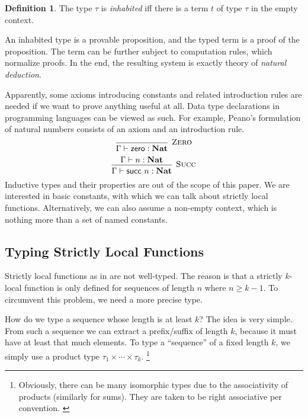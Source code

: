 \documentclass[11pt]{article}
\theoremstyle{definition}
\newtheorem{definition}{Definition}
\theoremstyle{plain}
\begin{document}
\begin{definition}
  The type \(\tau\) is \emph{inhabited} iff there is a term \(t\)
  of type \(\tau\) in the empty context.
\end{definition}

An inhabited type is a provable proposition, and the typed term is a
proof of the proposition.  The term can be further subject to
computation rules, which normalize proofs.  In the end, the resulting
system is exactly  theory of
\emph{natural deduction}.

Apparently, some axioms introducing constants and related introduction
rules are needed if we want to prove anything useful at all.  Data
type declarations in programming languages can be viewed as such.  For
example, Peano's formulation of natural numbers consists of an axiom
and an introduction rule.
%
\begin{equation*}
  \begin{prooftree}
    \infer0[\textsc{Zero}]{\Gamma \vdash \mathsf{zero} : \mathbf{Nat}}
  \end{prooftree}
\end{equation*}
%
\begin{equation*}
  \begin{prooftree}
    \hypo{\Gamma \vdash n : \mathbf{Nat}}
    \infer1[\textsc{Succ}]{
      \Gamma \vdash \mathsf{succ}\ n : \mathbf{Nat}}
  \end{prooftree}
\end{equation*}
%
Inductive types and their properties are out of the scope of this
paper.  We are interested in basic constants, with which we can talk
about strictly local functions.  Alternatively, we can also assume a
non-empty context, which is nothing more than a set of named
constants.

\subsection{Typing Strictly Local Functions}
Strictly local functions as in  are not
well-typed.  The reason is that a strictly \(k\)-local function is
only defined for sequences of length \(n\) where \(n \geq k-1\).  To
circumvent this problem, we need a more precise type.

How do we type a sequence whose length is at least \(k\)?  The idea
is very simple.  From such a sequence we can extract a prefix/suffix
of length \(k\), because it must have at least that much elements.  To
type a \enquote{sequence} of a fixed length \(k\), we simply use
a product type \(\tau_{1} \times \cdots \times \tau_{k}\).%
\footnote{Obviously, there can be many isomorphic types due to the
  associativity of products (similarly for sums).  They are taken to
  be right associative per convention.
  \label{fn:iso-assoc}}
\end{document}
